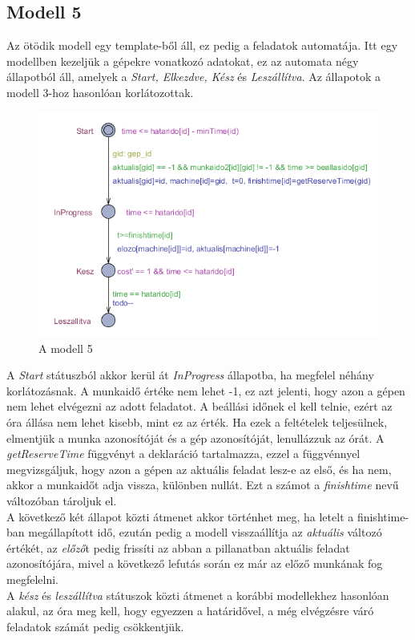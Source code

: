 \documentclass {report}
\begin{document}
\subsection{Modell 5}
Az ötödik modell egy template-ből áll, ez pedig a feladatok automatája. Itt egy modellben kezeljük a gépekre vonatkozó adatokat, ez az automata négy állapotból áll, amelyek a \emph{Start, Elkezdve, Kész} és \emph{Leszállítva}. Az állapotok a modell 3-hoz hasonlóan korlátozottak.\\
\begin{figure}[htpb]
\begin{center}
\includegraphics[height=6.5 cm]{modell_5}
\caption{A modell 5}
\end{center}
\end{figure}
 A \emph{Start} státuszból akkor kerül át \emph{InProgress} állapotba, ha megfelel néhány korlátozásnak. A munkaidő értéke nem lehet -1, ez azt jelenti, hogy azon a gépen nem lehet elvégezni az adott feladatot. A beállási időnek el kell telnie, ezért az óra állása nem lehet kisebb, mint ez az érték. Ha ezek a feltételek teljesülnek, elmentjük a munka azonosítóját és a gép azonosítóját, lenullázzuk az órát. A \emph{getReserveTime} függvényt a deklaráció tartalmazza, ezzel a függvénnyel megvizsgáljuk, hogy azon a gépen az aktuális feladat lesz-e az első, és ha nem, akkor a munkaidőt adja vissza, különben nullát. Ezt a számot a \emph{finishtime} nevű változóban tároljuk el.\\
 A következő két állapot közti átmenet akkor történhet meg, ha letelt a finishtime-ban megállapított idő, ezután pedig a modell visszaállítja az \emph{aktuális} változó értékét, az \emph{előző}t pedig frissíti az abban a pillanatban aktuális feladat azonosítójára, mivel a következő lefutás során ez már az előző munkának fog megfelelni. \\
 A \emph{kész} és \emph{leszállítva} státuszok közti átmenet a korábbi modellekhez hasonlóan alakul, az óra meg kell, hogy egyezzen a határidővel, a még elvégzésre váró feladatok számát pedig csökkentjük.
\end{document}
